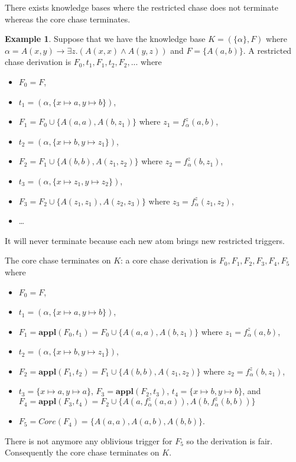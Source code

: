 \documentclass{article}
\theoremstyle{definition}
\newtheorem{example}{Example}[section]
\theoremstyle{remark}
\newcommand{\Appl}{\textbf{appl}}
\begin{document}
There exists knowledge bases where the restricted chase does not terminate whereas the core chase terminates. \begin{example}
Suppose that we have the knowledge base $K=(\{\alpha\},F)$ where $\alpha = A(x,y) \rightarrow \exists z.(A(x,x) \wedge A(y,z))$ and $F =  \{A(a,b)\}$. A restricted chase derivation is $F_0,t_1,F_1,t_2,F_2,...$ where 
\begin{itemize}
\item $F_0 = F$,
\item $t_1=(\alpha,\{x \mapsto a, y \mapsto b\})$, 
\item $F_1= F_0 \cup \{A(a,a),A(b,z_1)\}$ where $z_1 = f_\alpha^z(a,b)$,
\item $t_2 = (\alpha,\{x \mapsto b, y \mapsto z_1\})$, 
\item $F_2 = F_1 \cup \{A(b,b),A(z_1,z_2)\}$ where $z_2 = f_\alpha^z(b,z_1)$, 
\item $t_3 = (\alpha,\{x \mapsto z_1, y \mapsto z_2\})$, 
\item $F_3 =  F_2 \cup \{A(z_1,z_1),A(z_2,z_3)\}$ where $z_3 = f_\alpha^z(z_1,z_2)$,
\item \ldots\
\end{itemize}
It will never terminate because each new atom brings new restricted triggers. 

The core chase terminates on $K$: a core chase derivation is $F_0,F_1,F_2,F_3,F_4,F_5$ where 
\begin{itemize}
\item $F_0=F$, 
\item $t_1=(\alpha,\{x \mapsto a, y \mapsto b\})$, 
\item $F_1=\Appl(F_0,t_1) =F_0 \cup \{A(a,a),A(b,z_1)\}$ where $z_1 = f_\alpha^z(a,b)$, 
\item $t_2 = (\alpha,\{x \mapsto b, y \mapsto z_1\})$,
\item $F_2 =\Appl(F_1,t_2) =F_1 \cup \{A(b,b),A(z_1,z_2)\}$ where $z_2 = f_\alpha^z(b,z_1)$,
\item $t_3 = \{x \mapsto a, y \mapsto a\}$, $F_3=\Appl(F_2,t_3)$, $t_4 = \{x \mapsto b, y \mapsto b\}$, and $F_4=\Appl(F_3,t_4) = F_2 \cup \{A(a,f_\alpha^z(a,a)),A(b,f_\alpha^z(b,b))\}$
\item $F_5 = \textit{Core}(F_4)= \{A(a,a),A(a,b),A(b,b)\}$.
\end{itemize} 
There is not anymore any oblivious trigger for $F_5$ so the derivation is fair. Consequently the core chase terminates on $K$.

\end{example}
\end{document}
